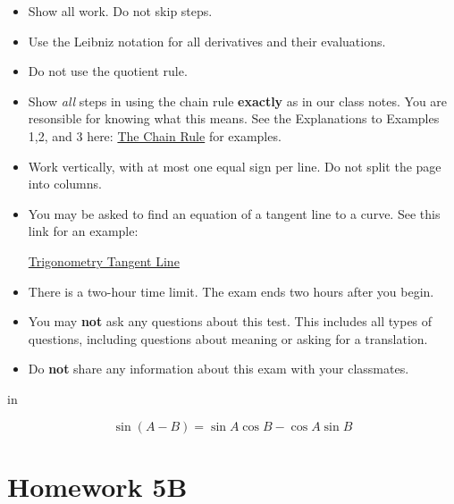 \documentclass{ximera}
\newcommand{\pskip}{\vskip 0.1 in}
\begin{document}
\begin{enumerate}
\begin{itemize}
\item Show all work. Do not skip steps.

\item Use the Leibniz notation for all derivatives and their evaluations.

\item Do not use the quotient rule.

\item Show \emph{all} steps in using the chain rule {\bf exactly} as in our class notes. You are resonsible for knowing what this means. See the Explanations to Examples 1,2, and 3 here: \href{https://ximera.osu.edu/calcone/Calculus1/ChainRule/ChainRule}{The Chain Rule} for examples.

\item Work vertically, with at most one equal sign per line. Do not split the page into columns.

\item You may be asked to find an equation of a tangent line to a curve. See this link for an example:

\href{https://ximera.osu.edu/calcone/Calculus1/TrigTangentLine/TrigTangentLine}{Trigonometry Tangent Line}

\item There is a two-hour time limit. The exam ends two hours after you begin.

\item You may {\bf not} ask any questions about this test. This includes all types of questions, including questions about meaning or asking for a translation.

\item Do {\bf not} share any information about this exam with your classmates.

\end{itemize}

\pskip


\[
 \sin (A-B) = \sin A \cos B - \cos A \sin B
\]


\end{enumerate}


\section{Homework 5B}
\end{document}
